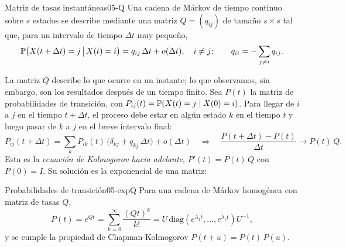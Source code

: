 \begin{definicion}{Matriz de tasas instantáneas}{05-Q}
Una cadena de Márkov de tiempo continuo sobre $s$ estados se describe mediante una matriz $Q=(q_{ij})$ de tamaño $s\times s$ tal que, para un intervalo de tiempo $\Delta t$ muy pequeño,
\begin{equation}\label{eq:05-Q}
\mathbb{P}\big(X(t+\Delta t)=j \,\big|\, X(t)=i\big) = q_{ij}\,\Delta t + o(\Delta t),\quad i\neq j;\qquad q_{ii} = -\sum_{j\neq i} q_{ij}.
\end{equation}
\end{definicion}

\begin{simbolos}
\end{simbolos}

La matriz $Q$ describe lo que ocurre en un instante; lo que observamos, sin embargo, son los resultados después de un tiempo finito. Sea $P(t)$ la matriz de probabilidades de transición, con $P_{ij}(t)=\mathbb{P}(X(t)=j\mid X(0)=i)$. Para llegar de $i$ a $j$ en el tiempo $t+\Delta t$, el proceso debe estar en algún estado $k$ en el tiempo $t$ y luego pasar de $k$ a $j$ en el breve intervalo final:
\[
P_{ij}(t+\Delta t) = \sum_k P_{ik}(t)\,\big(\delta_{kj}+q_{kj}\,\Delta t\big) + o(\Delta t)
\quad\Longrightarrow\quad
\frac{P(t+\Delta t)-P(t)}{\Delta t} \to P(t)\,Q.
\]
Esta es la \emph{ecuación de Kolmogorov hacia adelante}, $P'(t)=P(t)\,Q$ con $P(0)=I$. Su solución es la exponencial de una matriz:

\begin{teorema}{Probabilidades de transición}{05-expQ}
Para una cadena de Márkov homogénea con matriz de tasas $Q$,
\begin{equation}\label{eq:05-expQ}
P(t) = e^{Qt} = \sum_{k=0}^{\infty}\frac{(Qt)^k}{k!} = U\,\mathrm{diag}\!\left(e^{\lambda_1 t},\dots,e^{\lambda_s t}\right)U^{-1},
\end{equation}
y se cumple la propiedad de Chapman-Kolmogorov $P(t+u)=P(t)\,P(u)$.
\end{teorema}

\begin{simbolos}
\end{simbolos}

